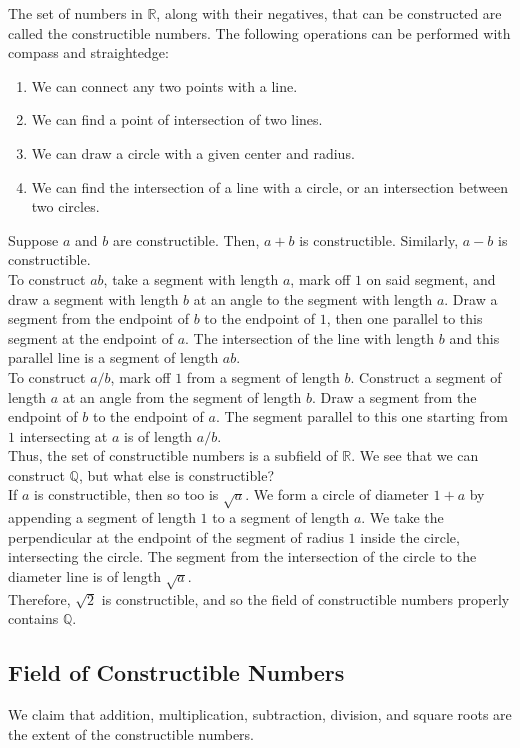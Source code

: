 \documentclass[10pt]{extarticle}
\newcommand{\Q}{\mathbb{Q}}
\newcommand{\R}{\mathbb{R}}
\begin{document}
  The set of numbers in $\R$, along with their negatives, that can be constructed are called the constructible numbers. The following operations can be performed with compass and straightedge:
  \begin{enumerate}[(1)]
    \item We can connect any two points with a line.
    \item We can find a point of intersection of two lines.
    \item We can draw a circle with a given center and radius.
    \item We can find the intersection of a line with a circle, or an intersection between two circles.
  \end{enumerate}
  Suppose $a$ and $b$ are constructible. Then, $a+b$ is constructible. Similarly, $a-b$ is constructible.\\

  To construct $ab$, take a segment with length $a$, mark off $1$ on said segment, and draw a segment with length $b$ at an angle to the segment with length $a$. Draw a segment from the endpoint of $b$ to the endpoint of $1$, then one parallel to this segment at the endpoint of $a$. The intersection of the line with length $b$ and this parallel line is a segment of length $ab$.\\

  To construct $a/b$, mark off $1$ from a segment of length $b$. Construct a segment of length $a$ at an angle from the segment of length $b$. Draw a segment from the endpoint of $b$ to the endpoint of $a$. The segment parallel to this one starting from $1$ intersecting at $a$ is of length $a/b$.\\

  Thus, the set of constructible numbers is a subfield of $\R$. We see that we can construct $\Q$, but what else is constructible?\\

  If $a$ is constructible, then so too is $\sqrt{a}$. We form a circle of diameter $1+a$ by appending a segment of length $1$ to a segment of length $a$. We take the perpendicular at the endpoint of the segment of radius $1$ inside the circle, intersecting the circle. The segment from the intersection of the circle to the diameter line is of length $\sqrt{a}$.\\

  Therefore, $\sqrt{2}$ is constructible, and so the field of constructible numbers properly contains $\Q$. 
  \subsection{Field of Constructible Numbers}%
  We claim that addition, multiplication, subtraction, division, and square roots are the extent of the constructible numbers.\\
\end{document}
